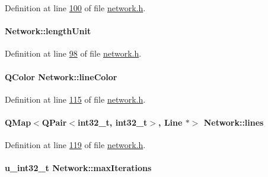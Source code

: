 Definition at line \hyperlink{network_8h_source_l00100}{100} of file \hyperlink{network_8h_source}{network.\+h}.

\hypertarget{class_network_ae46c0e2bf39b343875e3c69066fe2652}{}
\paragraph[{length\+Unit}]{ Network\+::length\+Unit\hspace{0.3cm}{\ttfamily [static]}}\label{class_network_ae46c0e2bf39b343875e3c69066fe2652}


Definition at line \hyperlink{network_8h_source_l00098}{98} of file \hyperlink{network_8h_source}{network.\+h}.

\hypertarget{class_network_a453db7f1a994603fe4d38ac5899eb09c}{}
\paragraph[{line\+Color}]{\setlength{\rightskip}{0pt plus 5cm}Q\+Color Network\+::line\+Color}\label{class_network_a453db7f1a994603fe4d38ac5899eb09c}


Definition at line \hyperlink{network_8h_source_l00115}{115} of file \hyperlink{network_8h_source}{network.\+h}.

\hypertarget{class_network_acda0fd42e712e460a08a0e96511ee7eb}{}
\paragraph[{lines}]{\setlength{\rightskip}{0pt plus 5cm}Q\+Map$<$Q\+Pair$<$int32\+\_\+t, int32\+\_\+t$>$, {\bf Line} $\ast$$>$ Network\+::lines}\label{class_network_acda0fd42e712e460a08a0e96511ee7eb}


Definition at line \hyperlink{network_8h_source_l00119}{119} of file \hyperlink{network_8h_source}{network.\+h}.

\hypertarget{class_network_a1a818069626eb82d58e3974a5b3492a6}{}
\paragraph[{max\+Iterations}]{\setlength{\rightskip}{0pt plus 5cm}u\+\_\+int32\+\_\+t Network\+::max\+Iterations\hspace{0.3cm}{\ttfamily [static]}}\label{class_network_a1a818069626eb82d58e3974a5b3492a6}


